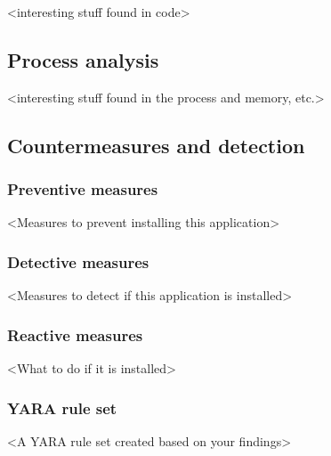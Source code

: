 <interesting stuff found in code>

\newpage
\subsection{Process analysis}

<interesting stuff found in the process and memory, etc.>

\newpage
\subsection{Countermeasures and detection}

\subsubsection{Preventive measures}


<Measures to prevent installing this application>

\subsubsection{Detective measures}

<Measures to detect if this application is installed>

\subsubsection{Reactive measures}

<What to do if it is installed>

\subsubsection{YARA rule set}

<A YARA rule set created based on your findings>
